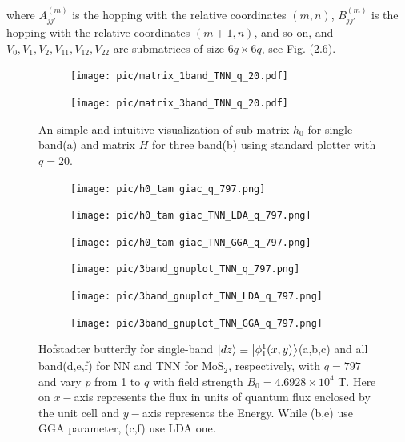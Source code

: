 \documentclass{report}
\begin{document}
where $A_{jj'}^{(m)}$ is the hopping with the relative coordinates $(m,n)$, $B_{jj'}^{(m)}$ is the hopping with the relative coordinates $(m+1,n)$, and so on,
and $V_{0},V_{1},V_{2},V_{11},V_{12},V_{22}$ are submatrices of size $6q \times 6q$, see Fig. (2.6).
\begin{figure}[htb]
	\centering
	\begin{subfigure}[b]{0.495\textwidth}
		\centering
		\texttt{[image: pic/matrix\_1band\_TNN\_q\_20.pdf]}
		\label{fig:3 band matrix}
	\end{subfigure}
	\begin{subfigure}[b]{0.495\textwidth}
		\centering
		\texttt{[image: pic/matrix\_3band\_TNN\_q\_20.pdf]}
		\label{fig:1 band matrix}
	\end{subfigure}
	\caption[A visualization of super matrix.]{
		An simple and intuitive visualization of sub-matrix $h_{0}$ for single-band(a) and matrix $H$ for three band(b) using standard plotter with $q = 20$.
	}
\end{figure}
\begin{figure}[htb]
	\centering
	\begin{subfigure}[b]{0.32\textwidth}
		\centering
		\texttt{[image: pic/h0\_tam giac\_q\_797.png]}
		\label{fig:3 band}
	\end{subfigure}
	\begin{subfigure}[b]{0.32\textwidth}
		\centering
		\texttt{[image: pic/h0\_tam giac\_TNN\_LDA\_q\_797.png]}
		\label{}
	\end{subfigure}
	\begin{subfigure}[b]{0.32\textwidth}
		\centering
		\texttt{[image: pic/h0\_tam giac\_TNN\_GGA\_q\_797.png]}
		\label{}
	\end{subfigure}
	\begin{subfigure}[b]{0.32\textwidth}
		\centering
		\texttt{[image: pic/3band\_gnuplot\_TNN\_q\_797.png]}
		\label{fig:1 band}
	\end{subfigure}
	\begin{subfigure}[b]{0.32\textwidth}
		\centering
		\texttt{[image: pic/3band\_gnuplot\_TNN\_LDA\_q\_797.png]}
		\label{}
	\end{subfigure}
	\begin{subfigure}[b]{0.32\textwidth}
		\centering
		\texttt{[image: pic/3band\_gnuplot\_TNN\_GGA\_q\_797.png]}
		\label{}
	\end{subfigure}
	\caption[Hofstadter butterfly for {TMD}.]{
		Hofstadter butterfly for single-band $\ket{dz} \equiv \ket{\phi_{1}^{1}(x,y)}$(a,b,c) and all band(d,e,f) for \ac{NN} and \ac{TNN} for MoS$_2$, respectively, with $q = 797$ and vary $p$ from 1 to $q$ with field strength $B_{0} = 4.6928 \times 10^{4}$ T. Here on $x-$axis represents the flux in units of quantum flux enclosed by the unit cell and $y-$axis represents the Energy. While (b,e) use \ac{GGA} parameter, (c,f) use \ac{LDA} one.
	}
\end{figure}
\end{document}
